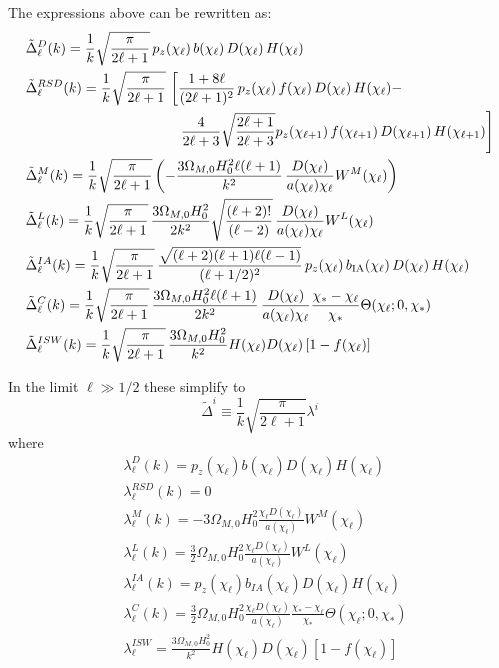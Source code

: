 \documentclass[a4paper,10pt]{article}
\begin{document}
The expressions above can be rewritten as:
\begin{align}
 &\tilde{\Delta}_\ell^D(k)=\frac{1}{k}\sqrt{\frac{\pi}{2\ell+1}}\,p_z(\chi_\ell)\,b(\chi_\ell)\,D(\chi_\ell)\,H(\chi_\ell)\\
 &\tilde{\Delta}_\ell^{RSD}(k)=\frac{1}{k}\sqrt{\frac{\pi}{2\ell+1}}\,\left[
 \frac{1+8\ell}{(2\ell+1)^2}\,p_z(\chi_\ell)\,f(\chi_\ell)\,D(\chi_\ell)\,H(\chi_\ell)-\right.\\
 &\hspace{3.8cm}\left.\frac{4}{2\ell+3}\sqrt{\frac{2\ell+1}{2\ell+3}}p_z(\chi_{\ell+1})\,f(\chi_{\ell+1})\,D(\chi_{\ell+1})\,H(\chi_{\ell+1})\right]\\
 &\tilde{\Delta}_\ell^M(k)=\frac{1}{k}\sqrt{\frac{\pi}{2\ell+1}}\left(-\frac{3\Omega_{M,0}H_0^2\ell(\ell+1)}{k^2}\,
 \frac{D(\chi_\ell)}{a(\chi_\ell)\chi_\ell}W^M(\chi_\ell)\right)\\
 &\tilde{\Delta}_\ell^L(k)=\frac{1}{k}\sqrt{\frac{\pi}{2\ell+1}}\,\frac{3\Omega_{M,0}H_0^2}{2k^2}\sqrt{\frac{(\ell+2)!}{(\ell-2)}}\,
 \frac{D(\chi_\ell)}{a(\chi_\ell)\chi_\ell}W^L(\chi_\ell)\\
 &\tilde{\Delta}_\ell^{IA}(k)=\frac{1}{k}\sqrt{\frac{\pi}{2\ell+1}}\,\frac{\sqrt{(\ell+2)(\ell+1)\ell(\ell-1)}}{(\ell+1/2)^2}\,p_z(\chi_\ell)\,b_{\rm IA}(\chi_\ell)\,D(\chi_\ell)\,H(\chi_\ell)\\
 &\tilde{\Delta}_\ell^C(k)=\frac{1}{k}\sqrt{\frac{\pi}{2\ell+1}}\,\frac{3\Omega_{M,0}H_0^2\ell(\ell+1)}{2k^2}\,
 \frac{D(\chi_\ell)}{a(\chi_\ell)\chi_\ell}\frac{\chi_*-\chi_\ell}{\chi_*}\Theta(\chi_\ell;0,\chi_*)\\
 &\tilde{\Delta}^{ISW}_\ell(k)=\frac{1}{k}\sqrt{\frac{\pi}{2\ell+1}}\,
 \frac{3\Omega_{M,0}H_0^2}{k^2}H(\chi_\ell)D(\chi_\ell)\left[1-f(\chi_\ell)\right]
\end{align}

In the limit $\ell\gg1/2$ these simplify to
\begin{equation}
  \tilde{\Delta}^i\equiv\frac{1}{k}\sqrt{\frac{\pi}{2\ell+1}}\lambda^i
\end{equation}
where
\begin{align}
  &\lambda_\ell^D(k)=p_z(\chi_\ell)b(\chi_\ell)D(\chi_\ell)H(\chi_\ell)\\
  &\lambda_\ell^{RSD}(k)=0\\
  &\lambda_\ell^M(k)=-3\Omega_{M,0}H_0^2\frac{\chi_\ell D(\chi_\ell)}{a(\chi_\ell)}W^M(\chi_\ell)\\
  &\lambda_\ell^L(k)=\frac{3}{2}\Omega_{M,0}H_0^2\frac{\chi_\ell D(\chi_\ell)}{a(\chi_\ell)}W^L(\chi_\ell)\\
  &\lambda_\ell^{IA}(k)=p_z(\chi_\ell)b_{IA}(\chi_\ell)D(\chi_\ell)H(\chi_\ell)\\
  &\lambda_\ell^C(k)=\frac{3}{2}\Omega_{M,0}H_0^2\frac{\chi_\ell D(\chi_\ell)}{a(\chi_\ell)}\frac{\chi_*-\chi_\ell}{\chi_*}\Theta(\chi_\ell;0,\chi_*)\\
  &\lambda_\ell^{ISW}=\frac{3\Omega_{M,0}H_0^2}{k^2}H(\chi_\ell)D(\chi_\ell)[1-f(\chi_\ell)]
\end{align}  
\end{document}
